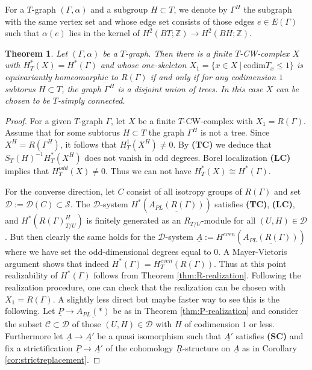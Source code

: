 \documentclass[12pt,a4paper]{article}
\newtheorem{thm}{Theorem}[section]
\theoremstyle{definition}
\begin{document}
For a $T$-graph $(\Gamma,\alpha)$ and a subgroup $H\subset T$, we denote by $\Gamma^H$ the subgraph with the same vertex set and whose edge set consists of those edges $e\in E(\Gamma)$ such that $\alpha(e)$ lies in the kernel of $H^2(BT;\mathbb{Z})\rightarrow H^2(BH;\mathbb{Z})$.
\begin{thm}\label{thm:GKM-realization}
Let $(\Gamma,\alpha)$ be a $T$-graph. Then there is a finite $T$-CW-complex $X$ with $H^*_T(X)=H^*(\Gamma)$ and whose one-skeleton $X_1=\{x\in X~|~\mathrm{codim} T_x\leq 1\}$ is equivariantly homeomorphic to $R(\Gamma)$ if and only if for any codimension $1$ subtorus $H\subset T$, the graph $\Gamma^H$ is a disjoint union of trees. In this case $X$ can be chosen to be $T$-simply connected.
\end{thm}

\begin{proof}
For a given $T$-graph $\Gamma$, let $X$ be a finite $T$-CW-complex with $X_1=R(\Gamma)$. Assume that for some subtorus $H\subset T$ the graph $\Gamma^H$ is not a tree. Since $X^H=R(\Gamma^H)$, it follows that $H_T^1(X^H)\neq 0$. By \textbf{(TC)} we deduce that $S_T(H)^{-1}H_T^*(X^H)$ does not vanish in odd degrees. Borel localization \textbf{(LC)} implies that $H^{odd}_T(X)\neq 0$. Thus we can not have $H_T^*(X)\cong H^*(\Gamma)$.

For the converse direction, let $C$ consist of all isotropy groups of $R(\Gamma)$ and set $\mathcal{D}:=\mathcal{D}(C)\subset \mathcal{S}$. The $\mathcal{D}$-system $H^*(\underline{A_{PL}(R(\Gamma))})$ satisfies \textbf{(TC)}, \textbf{(LC)}, and $H^*(R(\Gamma)^H_{T/U})$ is finitely generated as an $R_{T/U}$-module for all $(U,H)\in \mathcal{D}$. But then clearly the same holds for the $\mathcal{D}$-system $\underline{A}:=H^{even}(\underline{A_{PL}(R(\Gamma))})$ where we have set the odd-dimensional degrees equal to $0$. A Mayer-Vietoris argument shows that indeed $H^*(\Gamma)=H_T^{even}(R(\Gamma))$. Thus at this point realizability of $H^*(\Gamma)$ follows from Theorem \ref{thm:R-realization}. Following the realization procedure, one can check that the realization can be chosen with $X_1=R(\Gamma)$. A slightly less direct but maybe faster way to see this is the following. Let $\underline{P}\rightarrow \underline{A_{PL}(*)}$ be as in Theorem \ref{thm:P-realization} and consider the subset $\mathcal{C}\subset \mathcal{D}$ of those $(U,H)\in \mathcal{D}$ with $H$ of codimension $1$ or less. Furthermore let $\underline{A}\rightarrow \underline{A'}$ be a quasi isomorphism such that $\underline{A'}$ satisfies \textbf{(SC)} and fix a strictification $\underline{P}\rightarrow \underline{A'}$ of the cohomology $\underline{R}$-structure on $\underline{A}$ as in Corollary \ref{cor:strictreplacement}.


\end{proof}
\end{document}
